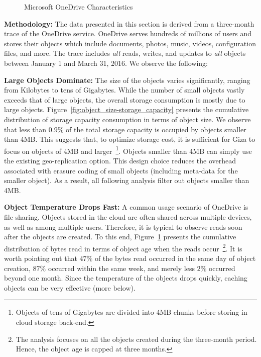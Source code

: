 \begin{figure}[tp]
\begin{subfigure}{.25\textwidth}
  \caption{}
  \label{fig:write_read_gap-bytes_read}
\end{subfigure}%
\caption{Microsoft OneDrive Characteristics}
\label{fig:case_for_giza}
\end{figure}

{\bf Methodology:} The data presented in this section is derived from a three-month trace of the OneDrive service. OneDrive serves hundreds of millions of users and stores their objects which include documents, photos, music, videos, configuration files, and more. The trace includes {\em all} reads, writes, and updates to {\em all} objects between January 1 and March 31, 2016. We observe the following:

{\bf Large Objects Dominate:} The size of the objects varies significantly, ranging from Kilobytes to tens of Gigabytes. While the number of small objects vastly exceeds that of large objects, the overall storage consumption is mostly due to large objects. Figure~\ref{fig:object_size-storage_capacity} presents the cumulative distribution of storage capacity consumption in terms of object size. We observe that less than $0.9\%$ of the total storage capacity is occupied by objects smaller than 4MB. This suggests that, to optimize storage cost, it is sufficient for Giza to focus on objects of 4MB and larger~\footnote{Objects of tens of Gigabytes are divided into 4MB chunks before storing in cloud storage back-end.}. Objects smaller than 4MB can simply use the existing geo-replication option. This design choice reduces the overhead associated with erasure coding of small objects (including meta-data for the smaller object). As a result, all following analysis filter out objects smaller than 4MB.

{\bf Object Temperature Drops Fast:} A common usage scenario of OneDrive is file sharing. Objects stored in the cloud are often shared across multiple devices, as well as among multiple users. Therefore, it is typical to observe reads soon after the objects are created. To this end, Figure~\ref{fig:write_read_gap-bytes_read} presents the cumulative distribution of bytes read in terms of object age when the reads occur~\footnote{The analysis focuses on all the objects created during the three-month period. Hence, the object age is capped at three months.}. It is worth pointing out that $47\%$ of the bytes read occurred in the same day of object creation, $87\%$ occurred within the same week, and merely less $2\%$ occurred beyond one month. Since the temperature of the objects drops quickly, caching objects can be very effective (more below). 

